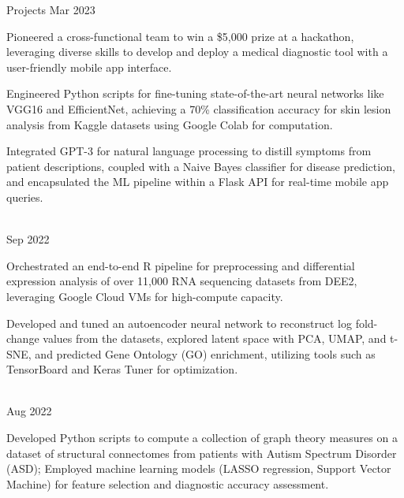 \documentclass[]{resume-knyte}
\begin{document}
\begin{topic}{Projects}
    {Mar 2023}
    {
        \item Pioneered a cross-functional team to win a \$5,000 prize at a hackathon, leveraging diverse skills to develop and deploy a medical diagnostic tool with a user-friendly mobile app interface.
        \vspace{-5pt}
    
        \item Engineered Python scripts for fine-tuning state-of-the-art neural networks like VGG16 and EfficientNet, achieving a 70\% classification accuracy for skin lesion analysis from Kaggle datasets using Google Colab for computation.
        \vspace{-5pt}
    
        \item Integrated GPT-3 for natural language processing to distill symptoms from patient descriptions, coupled with a Naive Bayes  classifier for disease prediction, and encapsulated the ML pipeline within a Flask API for real-time mobile app queries.
        \vspace{-5pt}
    }\\

    {Sep 2022}
    {
        \item Orchestrated an end-to-end R pipeline for preprocessing and differential expression analysis of over 11,000 RNA sequencing datasets from DEE2, leveraging Google Cloud VMs for high-compute capacity.
        \vspace{-5pt}

        \item Developed and tuned an autoencoder neural network to reconstruct log fold-change values from the datasets, explored latent space with PCA, UMAP, and t-SNE, and predicted Gene Ontology (GO) enrichment, utilizing tools such as TensorBoard and Keras Tuner for optimization.
        \vspace{-5pt}
    }\\

    {Aug 2022}
    {
        \item Developed Python scripts to compute a collection of graph theory measures on a dataset of structural connectomes from patients with Autism Spectrum Disorder (ASD); Employed machine learning models (LASSO regression, Support Vector Machine) for feature selection and diagnostic accuracy assessment.
        \vspace{-15pt}

}
\end{topic}
\end{document}

